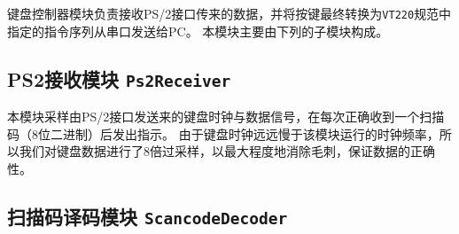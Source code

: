 
 键盘控制器模块负责接收PS/2接口传来的数据，并将按键最终转换为\texttt{VT220}规范中指定的指令序列从串口发送给PC。
 本模块主要由下列的子模块构成。

 \subsection{PS2接收模块 \texttt{Ps2Receiver}}

 本模块采样由PS/2接口发送来的键盘时钟与数据信号，在每次正确收到一个扫描码（8位二进制）后发出指示。
 由于键盘时钟远远慢于该模块运行的时钟频率，所以我们对键盘数据进行了8倍过采样，以最大程度地消除毛刺，保证数据的正确性。

 \subsection{扫描码译码模块 \texttt{ScancodeDecoder}}
 
